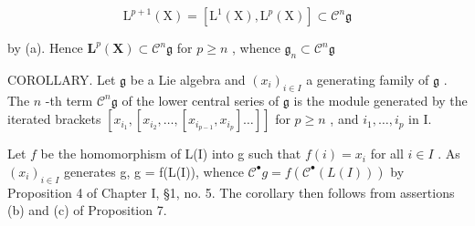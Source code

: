 \[
\mathrm{L} ^ {p + 1} (\mathrm{X}) = [ \mathrm{L} ^ {1} (\mathrm{X}), \mathrm{L} ^ {p} (\mathrm{X}) ] \subset \mathcal {C} ^ {n} \mathfrak {g}
\]

by (a). Hence \(\mathbf{L}^p (\mathbf{X})\subset \mathcal{C}^{n}\mathfrak{g}\) for \(p\geqslant n\) , whence \(\mathfrak{g}_n\subset \mathcal{C}^{n}\mathfrak{g}\)

COROLLARY. Let \(\mathfrak{g}\) be a Lie algebra and \((x_{i})_{i\in I}\) a generating family of \(\mathfrak{g}\) . The \(n\) -th term \(\mathcal{C}^{n}\mathfrak{g}\) of the lower central series of \(\mathfrak{g}\) is the module generated by the iterated brackets \([x_{i_1}, [x_{i_2}, \ldots, [x_{i_{p-1}}, x_{i_p}] \ldots]]\) for \(p \geqslant n\) , and \(i_1, \ldots, i_p\) in I.

Let \(f\) be the homomorphism of L(I) into g such that \(f(i) = x_i\) for all \(i \in I\) . As \((x_i)_{i \in I}\) generates g, g = f(L(I)), whence \(\mathcal{C}^{\bullet}g = f(\mathcal{C}^{\bullet}(L(I)))\) by Proposition 4 of Chapter I, §1, no. 5. The corollary then follows from assertions (b) and (c) of Proposition 7.

